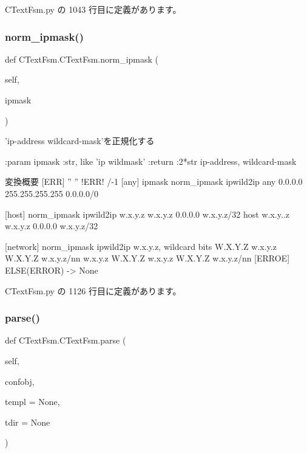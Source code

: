  C\+Text\+Fsm.\+py の 1043 行目に定義があります。

\mbox{\label{classCTextFsm_1_1CTextFsm_a4cc7b93a2ff3e94d32f2387530c89895}} 
\subsubsection{\texorpdfstring{norm\_ipmask()}{norm\_ipmask()}}
{\footnotesize\ttfamily def C\+Text\+Fsm.\+C\+Text\+Fsm.\+norm\+\_\+ipmask (\begin{DoxyParamCaption}\item[{}]{self,  }\item[{}]{ipmask }\end{DoxyParamCaption})}

\begin{DoxyVerb}'ip-address wildcard-mask'を正規化する

:param ipmask :str, like 'ip wildmask'
:return :2*str ip-address, wildcard-mask

変換概要
[ERR]
    ''          ''                          !ERR! /-1
[any] ipmask    norm_ipmask                 ipwild2ip
    any         0.0.0.0 255.255.255.255     0.0.0.0/0
    
[host]              norm_ipmask             ipwild2ip
    w.x.y.z         w.x.y.z 0.0.0.0         w.x.y.z/32
    host w.x.y..z   w.x.y.z 0.0.0.0         w.x.y.z/32
    
[network]           norm_ipmask             ipwild2ip
    w.x.y.z, wildcard bits W.X.Y.Z          
            w.x.y.z W.X.Y.Z         w.x.y.z/nn
    w.x.y.z W.X.Y.Z w.x.y.z W.X.Y.Z         w.x.y.z/nn
[ERROE]
    ELSE(ERROR) -> None
\end{DoxyVerb}
 

 C\+Text\+Fsm.\+py の 1126 行目に定義があります。

\mbox{\label{classCTextFsm_1_1CTextFsm_a4d6ef30a6341006802ebacf2d3fa5fc1}} 
\subsubsection{\texorpdfstring{parse()}{parse()}}
{\footnotesize\ttfamily def C\+Text\+Fsm.\+C\+Text\+Fsm.\+parse (\begin{DoxyParamCaption}\item[{}]{self,  }\item[{}]{confobj,  }\item[{}]{templ = {\ttfamily None},  }\item[{}]{tdir = {\ttfamily None} }\end{DoxyParamCaption})}

